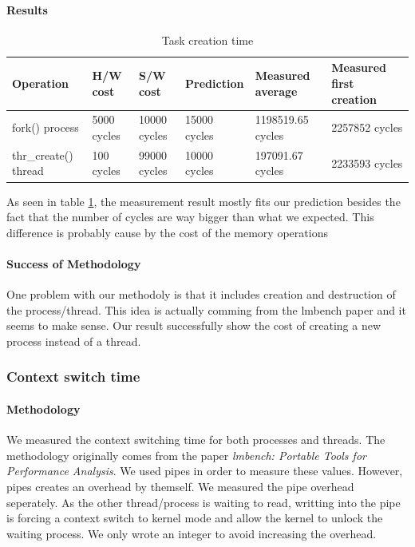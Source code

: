 \paragraph{Results}
\begin{table}[h]
\begin{center}
\begin{tabular}{| l | l | l | l | l | l |}
\hline
Operation & H/W cost & S/W cost & Prediction & Measured average & Measured first creation \\
\hline
fork() process 		& 5000 cycles & 10000 cycles 	& 15000 cycles& 1198519.65 cycles & 2257852 cycles\\ \hline
thr\_create() thread 	& 100 cycles & 99000 cycles	& 10000 cycles &
197091.67 cycles & 2233593 cycles\\ \hline
\end{tabular}
\end{center}
\caption{Task creation time\label{tab:task-creation}}

\end{table}

As seen in table \ref{tab:task-creation}, the measurement result mostly fits our prediction besides the fact that the number of cycles are way bigger than what we expected.
This difference is probably cause by the cost of the memory operations

\paragraph{Success of Methodology}
One problem with our methodoly is that it includes creation and destruction of
the process/thread.
This idea is actually comming from the lmbench paper and it seems to make sense.
Our result successfully show the cost of creating a new process instead of a
thread.


\subsubsection{Context switch time}
\paragraph{Methodology}

We measured the context switching time for both processes and threads.
The methodology originally comes from the paper \emph{lmbench: Portable Tools for Performance
Analysis}.
We used pipes in order to measure these values.
However, pipes creates an overhead by themself.
We measured the pipe overhead seperately.
As the other thread/process is waiting to read, writting into the pipe is
forcing a context switch to kernel mode and allow the kernel to unlock the
waiting process.
We only wrote an integer to avoid increasing the overhead.

